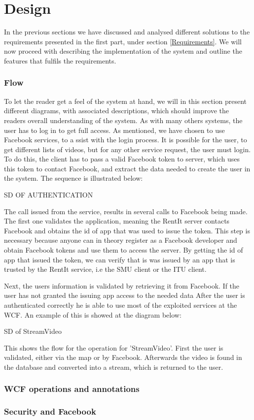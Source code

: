 \part{Design}
In the previous sections we have discussed and analysed different solutions to the requirements presented in the first part, under section \ref{Requirements}. We will now proceed with describing the implementation of the system and outline the features that fulfils the requirements.

\section{Flow}
To let the reader get a feel of the system at hand, we will in this section present different diagrams, with associated descriptions, which should improve the readers overall understanding of the system.
As with many others systems, the user has to log in to get full access. As mentioned, we have chosen to use Facebook services, to a ssist with the login process. It is possible for the user, to get different lists of videos, but for any other service request, the user must login. To do this, the client has to pass a valid Facebook token to server, which uses this token to contact Facebook, and extract the data needed to create the user in the system. The sequence is illustrated below:

SD OF AUTHENTICATION

The call issued from the service, results in several calls to Facebook being made. The first one validates the application, meaning the RentIt server contacts Facebook and obtains the id of app that was used to issue the token. This step is necessary because anyone can in theory register as a Facebook developer and obtain Facebook tokens and use them to access the server. By getting the id of app that issued the token, we can verify that is was issued by an app that is trusted by the RentIt service, i.e the SMU client or the ITU client.

Next, the users information is validated by retrieving it from Facebook. If the user has not granted the issuing app access to the needed data
After the user is authenticated correctly he is able to use most of the exploited services at the WCF. An example of this is showed at the diagram below:

SD of StreamVideo

This shows the flow for the operation for 'StreamVideo'. First the user is validated, either via the map or by Facebook. Afterwards the video is found in the database and converted into a stream, which is returned to the user. 


\section{WCF operations and annotations}


\section{Security and Facebook}


